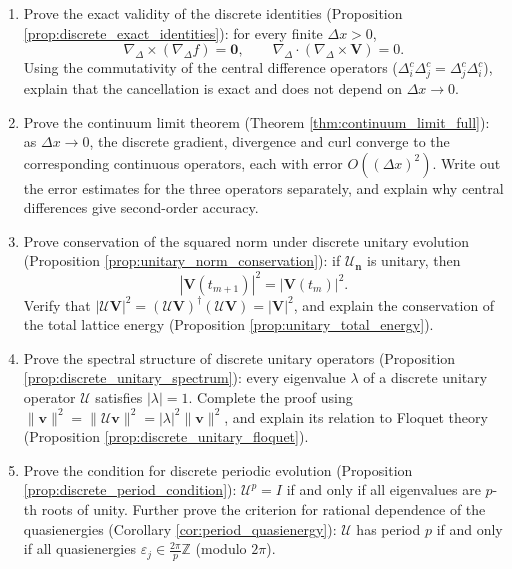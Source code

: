 \begin{enumerate}[leftmargin=3em, label=\textbf{Exercise \arabic*}]
    \item Prove the exact validity of the discrete identities (Proposition \ref{prop:discrete_exact_identities}):
    for every finite $\Delta x>0$,
    \[
    \nabla_{\Delta}\times(\nabla_{\Delta}f)=\mathbf{0},\qquad
    \nabla_{\Delta}\cdot(\nabla_{\Delta}\times\mathbf{V})=0.
    \]
    Using the commutativity of the central difference operators ($\Delta_i^c\Delta_j^c=\Delta_j^c\Delta_i^c$),
    explain that the cancellation is exact and does not depend on $\Delta x\to0$.

    \item Prove the continuum limit theorem (Theorem \ref{thm:continuum_limit_full}):
    as $\Delta x\to0$, the discrete gradient, divergence and curl converge to the corresponding continuous operators,
    each with error $O((\Delta x)^2)$.
    Write out the error estimates for the three operators separately, and explain why central differences give second-order accuracy.

    \item Prove conservation of the squared norm under discrete unitary evolution (Proposition \ref{prop:unitary_norm_conservation}):
    if $\mathcal{U}_{\mathbf{n}}$ is unitary, then
    \[
    |\mathbf{V}(t_{m+1})|^2=|\mathbf{V}(t_m)|^2.
    \]
    Verify that $|\mathcal{U}\mathbf{V}|^2=(\mathcal{U}\mathbf{V})^\dagger(\mathcal{U}\mathbf{V})=|\mathbf{V}|^2$,
    and explain the conservation of the total lattice energy (Proposition \ref{prop:unitary_total_energy}).

    \item Prove the spectral structure of discrete unitary operators (Proposition \ref{prop:discrete_unitary_spectrum}):
    every eigenvalue $\lambda$ of a discrete unitary operator $\mathcal{U}$ satisfies $|\lambda|=1$.
    Complete the proof using $\|\mathbf{v}\|^2=\|\mathcal{U}\mathbf{v}\|^2=|\lambda|^2\|\mathbf{v}\|^2$,
    and explain its relation to Floquet theory (Proposition \ref{prop:discrete_unitary_floquet}).

    \item Prove the condition for discrete periodic evolution (Proposition \ref{prop:discrete_period_condition}):
    $\mathcal{U}^p=I$ if and only if all eigenvalues are $p$-th roots of unity.
    Further prove the criterion for rational dependence of the quasienergies (Corollary \ref{cor:period_quasienergy}):
    $\mathcal{U}$ has period $p$ if and only if all quasienergies
    $\varepsilon_j\in\frac{2\pi}{p}\mathbb{Z}$ (modulo $2\pi$).


\end{enumerate}
